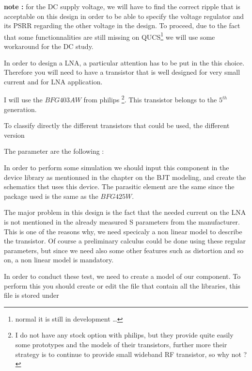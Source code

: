 \textbf{note :} for the DC supply voltage, we will have to find the correct ripple that is acceptable on this design in order to be able to specify the voltage regulator and its PSRR regarding the other voltage in the design. To proceed, due to the fact that some functionnalities are still missing on QUCS\footnote{normal it is still in development \ldots} we will use some workaround for the DC study.



In order to design a LNA, a particular attention has to be put in the this choice. Therefore you will need to have a transistor that is well designed for very small current and for LNA application. 

I will    use the $BFG403AW$ from  philips \footnote{I do not have any stock option with philips, but they provide quite easily some prototypes and the models of their transistors, further more their strategy is to continue to provide small wideband RF transistor, so why not ?}. This transistor belongs to the $5^{th}$ generation. 

To classify directly the different transistors that could be used, the different version 

The parameter are the following :



In order to perform some simulation we should input this component in the device library as mentionned in the chapter on the BJT modeling, and create the schematics thst uses this device. The parasitic element are the same since the package used is the same as the $BFG425W$.


The major problem in this design is the fact that the needed current on the LNA is not mentioned in the already measured S parameters from the manufacturer. This is one of the reasons why, we need specicaly a non linear model to describe the transistor. Of course a preliminary calculus could be done using these regular parameters, but since we need also some other features such as distortion and so on, a non linear model is mandatory.

\bigskip 

In order to conduct these test, we need to create a model of our component. To perform this you should create or edit the file that contain all the libraries, this file is stored under 

